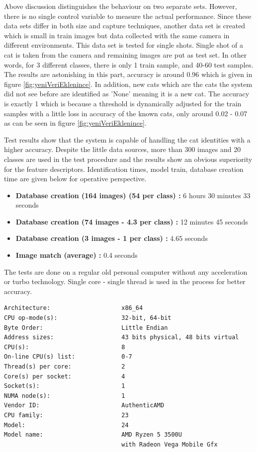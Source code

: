 Above discussion distinguishes the behaviour on two separate sets. However, there is no single control variable to measure the actual performance. Since these data sets differ in both size and capture techniques, another data set is created which is small in train images but data collected with the same camera in different environments. This data set is tested for single shots. Single shot of a cat is taken from the camera and remaining images are put as test set. In other words, for 3 different classes, there is only 1 train sample, and 40-60 test samples. The results are astonishing in this part, accuracy is around 0.96 which is given in figure \ref{fig:yeniVeriEklenince}. In addition, new cats which are the cats the system did not see before are identified as 'None' meaning it is a new cat. The accuracy is exactly 1 which is because a threshold is dynamically adjusted for the train samples with a little loss in accuracy of the known cats, only around 0.02 - 0.07 as can be seen in figure \ref{fig:yeniVeriEklenince}.



Test results show that the system is capable of handling the cat identities with a higher accuracy. Despite the little data sources, more than 300 images and 20 classes are used in the test procedure and the results show an obvious superiority for the feature descriptors. Identification times, model train, database creation time are given below for operative perspective.

\begin{itemize}
    \item \textbf{Database creation (164 images) (54 per class) : } 6 hours 30 minutes 33 seconds
    \item \textbf{Database creation (74 images - 4.3 per class) : } 12 minutes 45 seconds 
    \item \textbf{Database creation (3 images - 1 per class)    : } 4.65 seconds
    
    \item \textbf{Image match (average) : } 0.4 seconds
\end{itemize}

The tests are done on a regular old personal computer without any acceleration or turbo technology. Single core - single thread is used in the process for better accuracy.



\begin{verbatim}
Architecture:                    x86_64
CPU op-mode(s):                  32-bit, 64-bit
Byte Order:                      Little Endian
Address sizes:                   43 bits physical, 48 bits virtual
CPU(s):                          8
On-line CPU(s) list:             0-7
Thread(s) per core:              2
Core(s) per socket:              4
Socket(s):                       1
NUMA node(s):                    1
Vendor ID:                       AuthenticAMD
CPU family:                      23
Model:                           24
Model name:                      AMD Ryzen 5 3500U 
                                 with Radeon Vega Mobile Gfx
\end{verbatim}






